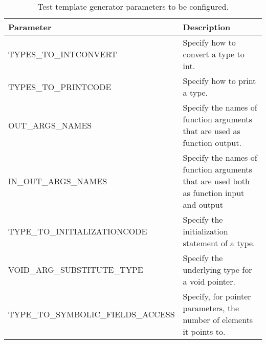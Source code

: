 
\begin{table}[t]
\tiny
\centering
\caption{Test template generator parameters to be configured.}
\label{table:ttg_semus}
\begin{tabular}{lp{8.5cm}}
\hline
\textbf{Parameter}  &  \textbf{Description} \\
\hline
TYPES\_TO\_INTCONVERT &  Specify how to convert a type to int. \\
TYPES\_TO\_PRINTCODE &  Specify how to print a type.  \\
OUT\_ARGS\_NAMES & Specify the names of function arguments that are used as function output. \\
IN\_OUT\_ARGS\_NAMES & Specify the names of function arguments that are used both as function input and output \\
TYPE\_TO\_INITIALIZATIONCODE &  Specify the initialization statement of a type.\\
VOID\_ARG\_SUBSTITUTE\_TYPE & Specify the underlying type for a void pointer. \\
TYPE\_TO\_SYMBOLIC\_FIELDS\_ACCESS & Specify, for pointer parameters, the number of elements it points to. \\
\hline
\end{tabular}
\end{table}


